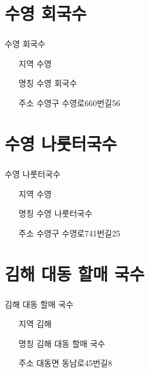 \documentclass[aspectratio=1610,17pt,xcolor=pdftex,dvipsnames,table,handout]{beamer}
\begin{document}
		\section{ 수영 회국수	}
		\begin{frame} [t,plain]
		\frametitle{ }
			\begin{block} {	수영 회국수	}
			\setlength{\leftmargini}{4em}			
			\begin{itemize}
				\item [지역] 수영	
				\item [명칭] 수영 회국수	
				\item [주소] 수영구 수영로660번길56	
			\end{itemize}
			\end{block}						
		\end{frame}						




		\section{ 수영 나룻터국수	}
		\begin{frame} [t,plain]
		\frametitle{ }
			\begin{block} {	수영 나룻터국수	}
			\setlength{\leftmargini}{4em}			
			\begin{itemize}
				\item [지역] 수영	
				\item [명칭] 수영 나룻터국수	
				\item [주소] 수영구 수영로741번길25
			\end{itemize}
			\end{block}						
		\end{frame}						


		\section{ 김해 대동 할매 국수	}
		\begin{frame} [t,plain]
		\frametitle{ }
			\begin{block} {	김해 대동 할매 국수	}
			\setlength{\leftmargini}{4em}			
			\begin{itemize}
				\item [지역] 김해	
				\item [명칭] 김해 대동 할매 국수	
				\item [주소] 대동면 동남로45번길8
			\end{itemize}
			\end{block}						
		\end{frame}						
\end{document}
